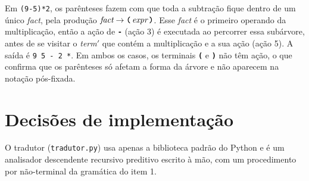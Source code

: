\documentclass[11pt,a4paper]{article}
\newcommand{\nt}[1]{\textit{#1}}                 %
\newcommand{\tm}[1]{\texttt{\textbf{#1}}}        %
\newcommand{\pr}{\ensuremath{\rightarrow}}
\newcommand{\linha}{\ensuremath{'}}
\begin{document}
	Em \texttt{(9-5)*2}, os parênteses fazem com que toda a subtração fique dentro de um único \nt{fact}, pela produção $\nt{fact} \pr \tm{(}\,\nt{expr}\,\tm{)}$. Esse \nt{fact} é o primeiro operando da multiplicação, então a ação de \tm{-} (ação 3) é executada ao percorrer essa subárvore, antes de se visitar o \nt{term}\linha{} que contém a multiplicação e a sua ação (ação 5). A saída é \texttt{9 5 - 2 *}. Em ambos os casos, os terminais \tm{(} e \tm{)} não têm ação, o que confirma que os parênteses só afetam a forma da árvore e não aparecem na notação pós-fixada.
	
	\section{Decisões de implementação}
	
	O tradutor (\texttt{tradutor.py}) usa apenas a biblioteca padrão do Python e é um analisador descendente recursivo preditivo escrito à mão, com um procedimento por não-terminal da gramática do item 1.
	
\end{document}
